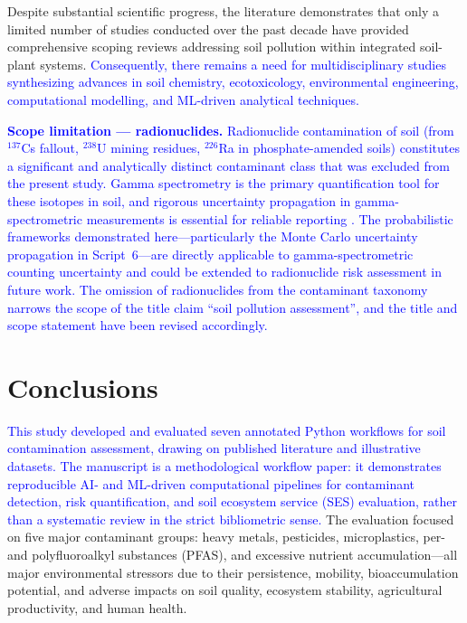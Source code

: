 \documentclass[environments,article,submit,pdftex,moreauthors]{Definitions/mdpi}
\begin{document}
Despite substantial scientific progress, the literature demonstrates that only a limited number of studies conducted over the past decade have provided comprehensive scoping reviews addressing soil pollution within integrated soil-plant systems. \textcolor{blue}{Consequently, there remains a need for multidisciplinary studies synthesizing advances in soil chemistry, ecotoxicology, environmental engineering, computational modelling, and ML-driven analytical techniques.}

\textcolor{blue}{\textbf{Scope limitation --- radionuclides.} Radionuclide contamination of soil (from $^{137}$Cs fallout, $^{238}$U mining residues, $^{226}$Ra in phosphate-amended soils) constitutes a significant and analytically distinct contaminant class that was excluded from the present study. Gamma spectrometry is the primary quantification tool for these isotopes in soil, and rigorous uncertainty propagation in gamma-spectrometric measurements is essential for reliable reporting \cite{Dragovi2005}. The probabilistic frameworks demonstrated here---particularly the Monte Carlo uncertainty propagation in Script~6---are directly applicable to gamma-spectrometric counting uncertainty and could be extended to radionuclide risk assessment in future work. The omission of radionuclides from the contaminant taxonomy narrows the scope of the title claim ``soil pollution assessment'', and the title and scope statement have been revised accordingly.}

\section{Conclusions}\label{sec7}

\textcolor{blue}{This study developed and evaluated seven annotated Python workflows for soil contamination assessment, drawing on published literature and illustrative datasets. The manuscript is a methodological workflow paper: it demonstrates reproducible AI- and ML-driven computational pipelines for contaminant detection, risk quantification, and soil ecosystem service (SES) evaluation, rather than a systematic review in the strict bibliometric sense.} The evaluation focused on five major contaminant groups: heavy metals, pesticides, microplastics, per- and polyfluoroalkyl substances (PFAS), and excessive nutrient accumulation---all major environmental stressors due to their persistence, mobility, bioaccumulation potential, and adverse impacts on soil quality, ecosystem stability, agricultural productivity, and human health.
\end{document}
